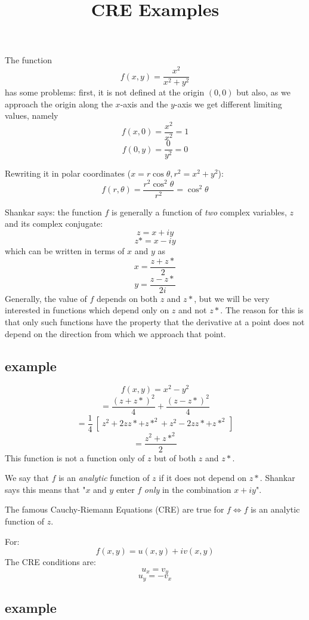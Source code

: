 \documentclass[11pt, oneside]{article}
\title{CRE Examples}
\date{}
\begin{document}
\maketitle
\Large


The function
\[ f(x,y) = \frac{x^2}{x^2 + y^2} \]
has some problems:  first, it is not defined at the origin $(0,0)$ but also, as we approach the origin along the $x$-axis and the $y$-axis we get different limiting values, namely
\[ f(x,0) = \frac{x^2}{x^2} = 1 \]
\[ f(0,y) = \frac{0}{y^2} = 0 \]

Rewriting it in polar coordinates ($x = r \cos \theta, r^2 = x^2 + y^2$):
\[ f(r,\theta) = \frac{r^2 \cos^2 \theta}{r^2} = \cos^2 \theta \]

Shankar says:  the function $f$ is generally a function of \emph{two} complex variables, $z$ and its complex conjugate:
\[ z = x + iy \]
\[ z* = x - iy \]
which can be written in terms of $x$ and $y$ as
\[ x = \frac{z + z*}{2} \]
\[ y = \frac{z - z*}{2i} \]
Generally, the value of $f$ depends on both $z$ and $z*$, but we will be very interested in functions which depend only on $z$ and not $z*$.  The reason for this is that only such functions have the property that the derivative at a point does not depend on the direction from which we approach that point.

\subsection*{example}

\[ f(x,y) = x^2 - y^2 \]
\[ = \frac{(z+z*)^2}{4} + \frac{(z-z*)^2}{4} \]
\[ = \frac{1}{4} \ [ \ z^2 + 2zz* + z*^2 + z^2 - 2zz* + z*^2 \ ] \]
\[ = \frac{z^2 + z*^2}{2} \]
This function is not a function only of $z$ but of both $z$ and $z*$.

We say that $f$ is an \emph{analytic} function of $z$ if it does not depend on $z*$.  Shankar says this means that "$x$ and $y$ enter $f$ \emph{only} in the combination $x + iy$".

The famous Cauchy-Riemann Equations (CRE) are true for $f \iff f$ is an analytic function of $z$.  

For:
\[ f(x,y) = u(x,y) + iv(x,y) \]
The CRE conditions are:
\[ u_x = v_y \]
\[ u_y = -v_x \]

\subsection*{example}
\end{document}
